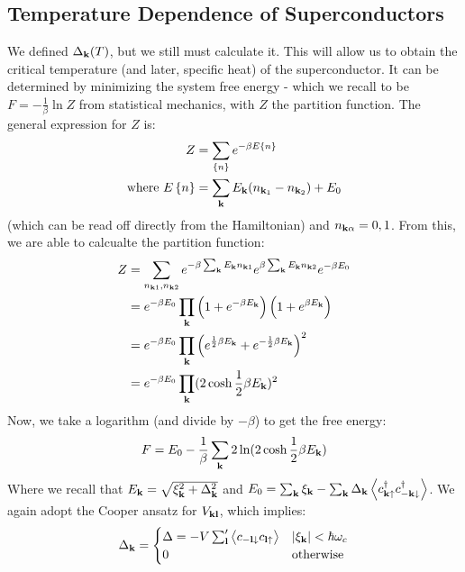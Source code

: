 \subsection{Temperature Dependence of Superconductors}
We defined $\Delta_{\mathbf{k}}(T)$, but we still must calculate it. This will allow us to obtain the critical temperature (and later, specific heat) of the superconductor. It can be determined by minimizing the system free energy - which we recall to be $F = -\frac{1}{\beta}\ln Z$ from statistical mechanics, with $Z$ the partition function. The general expression for $Z$ is:
\begin{equation}
    \begin{split}
        Z &= \sum_{\set{n}} e^{-\beta E\set{n}}
        \\ \text{where } E\set{n} &= \sum_{\mathbf{k}}E_{\mathbf{k}}(n_{\mathbf{k}_1} - n_{\mathbf{k}_2}) + E_0
    \end{split}
\end{equation}
(which can be read off directly from the Hamiltonian) and $n_{\mathbf{k}\alpha} = 0, 1$. From this, we are able to calcualte the partition function:
\begin{equation}
    \begin{split}
        Z &= \sum_{n_{\mathbf{k}1}, n_{\mathbf{k}2}} e^{-\beta\sum_{\mathbf{k}}E_{\mathbf{k}}n_{\mathbf{k}1}}e^{\beta\sum_{\mathbf{k}}E_{\mathbf{k}}n_{\mathbf{k}2}}e^{-\beta E_0}
        \\ &= e^{-\beta E_0}\prod_{\mathbf{k}}\left(1 + e^{-\beta E_{\mathbf{k}}}\right)\left(1 + e^{\beta E_{\mathbf{k}}}\right)
        \\ &= e^{-\beta E_0}\prod_{\mathbf{k}}\left(e^{\frac{1}{2}\beta E_{\mathbf{k}}} + e^{-\frac{1}{2}\beta E_{\mathbf{k}}}\right)^2
        \\ &= e^{-\beta E_0}\prod_{\mathbf{k}}(2\cosh \frac{1}{2}\beta E_{\mathbf{k}})^2
    \end{split}
\end{equation}
Now, we take a logarithm (and divide by $-\beta$) to get the free energy:
\begin{equation}
    F = E_0 - \frac{1}{\beta}\sum_{\mathbf{k}}2\ln(2\cosh\frac{1}{2}\beta E_{\mathbf{k}})
\end{equation}
Where we recall that $E_{\mathbf{k}} = \sqrt{\xi_{\mathbf{k}}^2 + \Delta_{\mathbf{k}}^2}$ and $E_0 = \sum_{\mathbf{k}}\xi_{\mathbf{k}} - \sum_{\mathbf{k}}\Delta_{\mathbf{k}}\left< c^\dagger_{\mathbf{k}\uparrow}c^\dagger_{-\mathbf{k}\downarrow} \right>$. We again adopt the Cooper ansatz for $V_{\mathbf{k}\mathbf{l}}$, which implies:
\begin{align*}
    \Delta_{\mathbf{k}} = \begin{cases}
        \Delta = -V\sum_{\mathbf{l}}'\left< c_{-\mathbf{l}\downarrow}c_{\mathbf{l}\uparrow} \right> & \lvert \xi_{\mathbf{k}} \rvert < \hbar \omega_c
        \\ 0 & \text{otherwise}
    \end{cases}
\end{align*}
